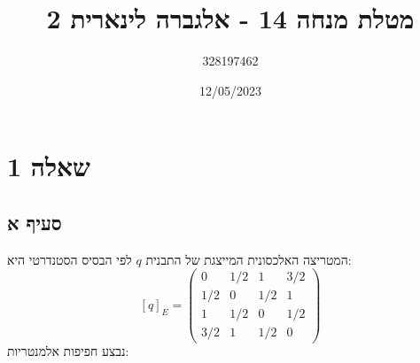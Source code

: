 \documentclass{article}
\title{מטלת מנחה 14 - אלגברה לינארית 2}
\author{328197462}
\date{12/05/2023}
\begin{document}
\maketitle

\section*{שאלה 1}
\subsection*{סעיף א}

המטריצה האלכסונית המייצגת של התבנית $q$ לפי הבסיס הסטנדרטי היא:
\[
    [q]_E = \begin{pmatrix}
        0   & 1/2 & 1   & 3/2 \\
        1/2 & 0   & 1/2 & 1   \\
        1   & 1/2 & 0   & 1/2 \\
        3/2 & 1   & 1/2 & 0
    \end{pmatrix}
\]
נבצע חפיפות אלמנטריות:
\end{document}
